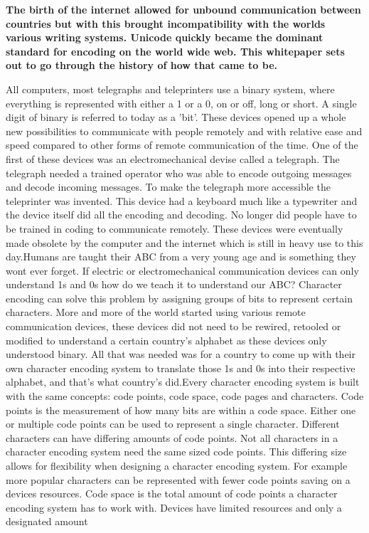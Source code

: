 \documentclass{article}
\begin{document}
\thispagestyle{titlepage}
\centering{[redacted] \break [redacted] \break [redacted] \break [redacted]}

\begin{multicols*}{2}
\textbf{
The birth of the internet allowed for unbound communication between countries but with this brought incompatibility with the worlds various writing systems. Unicode quickly became the dominant standard for encoding on the world wide web. This whitepaper sets out to go through the history of how that came to be.
} \break\break
{}\begin{flushleft} 
All computers, most telegraphs and teleprinters use a binary system, where everything is represented with either a 1 or a 0, on or off, long or short. A single digit of binary is referred to today as a 'bit'. These devices opened up a whole new possibilities to communicate with people remotely and with relative ease and speed compared to other forms of remote communication of the time. One of the first of these devices was an electromechanical devise called a telegraph. The telegraph needed a trained operator who was able to encode outgoing messages and decode incoming messages. To make the telegraph more accessible the teleprinter was invented. This device had a keyboard much like a typewriter and the device itself did all the encoding and decoding. No longer did people have to be trained in coding to communicate remotely. These devices were eventually made obsolete by the computer and the internet which is still in heavy use to this day.\linebreak\linebreak Humans are taught their ABC from a very young age and is something they wont ever forget. If electric or electromechanical communication devices can only understand 1s and 0s how do we teach it to understand our ABC? Character encoding can solve this problem by assigning groups of bits to represent certain characters. More and more of the world started using various remote communication devices, these devices did not need to be rewired, retooled or modified to understand a certain country's alphabet as these devices only understood binary. All that was needed was for a country to come up with their own character encoding system to translate those 1s and 0s into their respective alphabet, and that's what country's did.\linebreak\linebreak Every character encoding system is built with the same concepts: code points, code space, code pages and characters. Code points is the measurement of how many bits are within a code space. Either one or multiple code points can be used to represent a single character. Different characters can have differing amounts of code points. Not all characters in a character encoding system need the same sized code points. This differing size allows for flexibility when designing a character encoding system. For example more popular characters can be represented with fewer code points saving on a devices resources. Code space is the total amount of code points a character encoding system has to work with. Devices have limited resources and only a designated amount 
\end{flushleft}
\end{multicols*}
\end{document}
